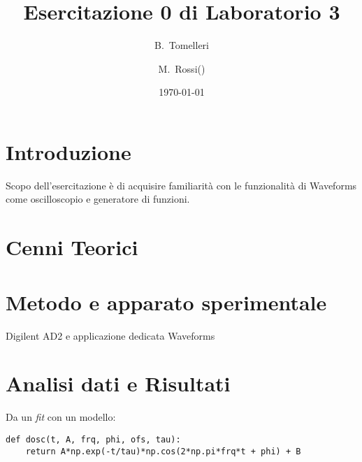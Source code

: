 \documentclass[a4paper, 12pt, italian]{article}
\title{Esercitazione 0 di Laboratorio 3}
\author{B.~Tomelleri\thanksdf \and M.~Rossi(\protect\footnotemark[1] )}
\date{\today}
\begin{document}
\maketitle

\section{Introduzione}
Scopo dell’esercitazione è di acquisire familiarità con le funzionalità
di Waveforms come oscilloscopio e generatore di funzioni.

\section{Cenni Teorici}

\section{Metodo e apparato sperimentale}
Digilent AD2 e applicazione dedicata Waveforms

\section{Analisi dati e Risultati}

Da un \emph{fit} con un modello:
\begin{lstlisting}
def dosc(t, A, frq, phi, ofs, tau):
    return A*np.exp(-t/tau)*np.cos(2*np.pi*frq*t + phi) + B
\end{lstlisting}
\end{document}
